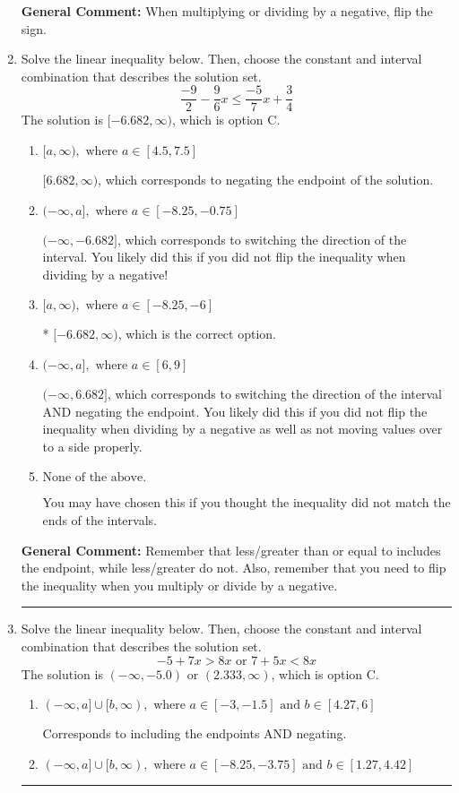 \documentclass{extbook}[14pt]
\newcommand{\litem}[1]{\item #1

\rule{\textwidth}{0.4pt}}
\begin{document}
\begin{enumerate}
{\textbf{General Comment:} When multiplying or dividing by a negative, flip the sign.
}
\litem{
Solve the linear inequality below. Then, choose the constant and interval combination that describes the solution set.
\[ \frac{-9}{2} - \frac{9}{6} x \leq \frac{-5}{7} x + \frac{3}{4} \]The solution is \( [-6.682, \infty) \), which is option C.\begin{enumerate}[label=\Alph*.]
\item \( [a, \infty), \text{ where } a \in [4.5, 7.5] \)

 $[6.682, \infty)$, which corresponds to negating the endpoint of the solution.
\item \( (-\infty, a], \text{ where } a \in [-8.25, -0.75] \)

 $(-\infty, -6.682]$, which corresponds to switching the direction of the interval. You likely did this if you did not flip the inequality when dividing by a negative!
\item \( [a, \infty), \text{ where } a \in [-8.25, -6] \)

* $[-6.682, \infty)$, which is the correct option.
\item \( (-\infty, a], \text{ where } a \in [6, 9] \)

 $(-\infty, 6.682]$, which corresponds to switching the direction of the interval AND negating the endpoint. You likely did this if you did not flip the inequality when dividing by a negative as well as not moving values over to a side properly.
\item \( \text{None of the above}. \)

You may have chosen this if you thought the inequality did not match the ends of the intervals.
\end{enumerate}

\textbf{General Comment:} Remember that less/greater than or equal to includes the endpoint, while less/greater do not. Also, remember that you need to flip the inequality when you multiply or divide by a negative.
}
\litem{
Solve the linear inequality below. Then, choose the constant and interval combination that describes the solution set.
\[ -5 + 7 x > 8 x \text{ or } 7 + 5 x < 8 x \]The solution is \( (-\infty, -5.0) \text{ or } (2.333, \infty) \), which is option C.\begin{enumerate}[label=\Alph*.]
\item \( (-\infty, a] \cup [b, \infty), \text{ where } a \in [-3, -1.5] \text{ and } b \in [4.27, 6] \)

Corresponds to including the endpoints AND negating.
\item \( (-\infty, a] \cup [b, \infty), \text{ where } a \in [-8.25, -3.75] \text{ and } b \in [1.27, 4.42] \)


\end{enumerate}}
\end{enumerate}
\end{document}
